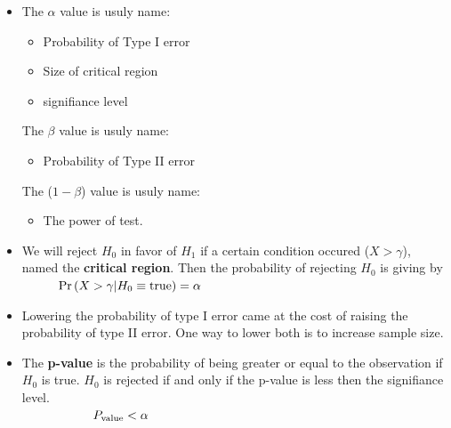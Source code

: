 \documentclass[10pt, french]{article}
\begin{document}
\begin{multicols*}{3}
\begin{itemize}[align=left,leftmargin=*]
\item The $\alpha$ value is usuly name:
\begin{itemize}
  \item Probability of Type I error
  \item Size of critical region
  \item signifiance level
\end{itemize}
The $\beta$ value is usuly name:
\begin{itemize}
  \item Probability of Type II error
\end{itemize}
The ($1 - \beta$) value is usuly name:
\begin{itemize}
  \item The power of test.
\end{itemize}
\item We will reject $H_0$ in favor of $H_1$ if a certain condition occured ($X>\gamma$), named the \textbf{critical region}. Then the probability of rejecting $H_0$ is giving by \\
$\hspace*{1cm} \Pr \left( X>\gamma|H_0\equiv \mathrm{true} \right) = \alpha$
\item Lowering the probability of type I error came at the cost of raising the probability of type II error. One way to lower both is to increase sample size.
\item The \textbf{p-value} is the probability of being greater or equal to the observation if $H_0$ is true. $H_0$ is rejected if and only if the p-value is less then the signifiance level. \\ $\hspace*{2cm} P_{\mathrm{value}}<\alpha$
\end{itemize}


\end{multicols*}
\end{document}
